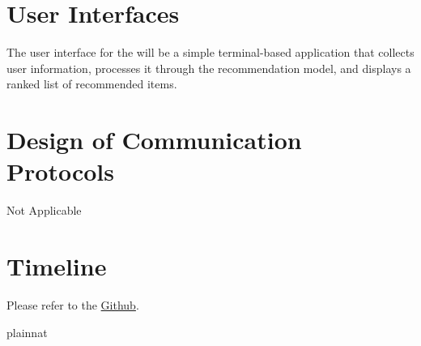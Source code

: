 \documentclass[12pt, titlepage]{article}
\begin{document}

\section{User Interfaces}
The user interface for the \progname will be a simple terminal-based application that collects user information, processes it through the recommendation model, and displays a ranked list of recommended items.

\section{Design of Communication Protocols}

Not Applicable

\section{Timeline}

Please refer to the \hyperref{https://github.com/V-AS/Two-tower-recommender-system/tree/main}{}{}{Github}.

 {plainnat}


\newpage{}
\end{document}
